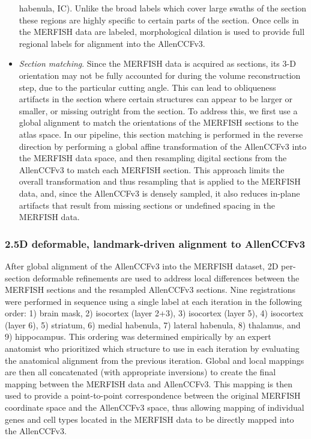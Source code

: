 \documentclass[
  12pt,
]{article}
\begin{document}
\begin{itemize}
  habenula, IC). Unlike the broad labels which cover large swaths of the
  section these regions are highly specific to certain parts of the
  section. Once cells in the MERFISH data are labeled, morphological
  dilation is used to provide full regional labels for alignment into
  the AllenCCFv3.
\item
  \emph{Section matching}. Since the MERFISH data is acquired as
  sections, its 3-D orientation may not be fully accounted for during
  the volume reconstruction step, due to the particular cutting angle.
  This can lead to obliqueness artifacts in the section where certain
  structures can appear to be larger or smaller, or missing outright
  from the section. To address this, we first use a global alignment to
  match the orientations of the MERFISH sections to the atlas space. In
  our pipeline, this section matching is performed in the reverse
  direction by performing a global affine transformation of the
  AllenCCFv3 into the MERFISH data space, and then resampling digital
  sections from the AllenCCFv3 to match each MERFISH section. This
  approach limits the overall transformation and thus resampling that is
  applied to the MERFISH data, and, since the AllenCCFv3 is densely
  sampled, it also reduces in-plane artifacts that result from missing
  sections or undefined spacing in the MERFISH data.
\end{itemize}

\hypertarget{d-deformable-landmark-driven-alignment-to-allenccfv3}{%
\subsubsection{2.5D deformable, landmark-driven alignment to
AllenCCFv3}\label{d-deformable-landmark-driven-alignment-to-allenccfv3}}

After global alignment of the AllenCCFv3 into the MERFISH dataset, 2D
per-section deformable refinements are used to address local differences
between the MERFISH sections and the resampled AllenCCFv3 sections. Nine
registrations were performed in sequence using a single label at each
iteration in the following order: 1) brain mask, 2) isocortex (layer
2+3), 3) isocortex (layer 5), 4) isocortex (layer 6), 5) striatum, 6)
medial habenula, 7) lateral habenula, 8) thalamus, and 9) hippocampus.
This ordering was determined empirically by an expert anatomist who
prioritized which structure to use in each iteration by evaluating the
anatomical alignment from the previous iteration. Global and local
mappings are then all concatenated (with appropriate inversions) to
create the final mapping between the MERFISH data and AllenCCFv3. This
mapping is then used to provide a point-to-point correspondence between
the original MERFISH coordinate space and the AllenCCFv3 space, thus
allowing mapping of individual genes and cell types located in the
MERFISH data to be directly mapped into the AllenCCFv3.
\end{document}

